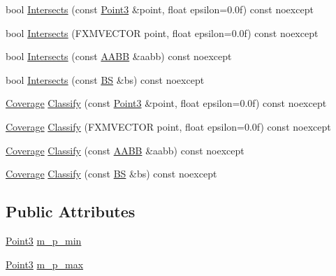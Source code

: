 \begin{DoxyCompactItemize}
\item 
bool \hyperlink{structmage_1_1_a_a_b_b_a467e6e2b3e1508982229ab40a36823c4}{Intersects} (const \hyperlink{structmage_1_1_point3}{Point3} \&point, float epsilon=0.\+0f) const noexcept
\item 
bool \hyperlink{structmage_1_1_a_a_b_b_adba18d1e707f7b926476948216353206}{Intersects} (F\+X\+M\+V\+E\+C\+T\+OR point, float epsilon=0.\+0f) const noexcept
\item 
bool \hyperlink{structmage_1_1_a_a_b_b_a9c776b78b3125957bafc9ee99f7eedee}{Intersects} (const \hyperlink{structmage_1_1_a_a_b_b}{A\+A\+BB} \&aabb) const noexcept
\item 
bool \hyperlink{structmage_1_1_a_a_b_b_ac51fa4b4d3100d587c6a2d2b5513ad88}{Intersects} (const \hyperlink{structmage_1_1_b_s}{BS} \&bs) const noexcept
\item 
\hyperlink{namespacemage_aa9fe157e5a578a103160266df8cccb0a}{Coverage} \hyperlink{structmage_1_1_a_a_b_b_a771c9e7fb467e6ae12bd3ea879a8d9b9}{Classify} (const \hyperlink{structmage_1_1_point3}{Point3} \&point, float epsilon=0.\+0f) const noexcept
\item 
\hyperlink{namespacemage_aa9fe157e5a578a103160266df8cccb0a}{Coverage} \hyperlink{structmage_1_1_a_a_b_b_acb76f0bfa297a297459736892508a8f4}{Classify} (F\+X\+M\+V\+E\+C\+T\+OR point, float epsilon=0.\+0f) const noexcept
\item 
\hyperlink{namespacemage_aa9fe157e5a578a103160266df8cccb0a}{Coverage} \hyperlink{structmage_1_1_a_a_b_b_a835279b552703bd72fa19856ad27cbd7}{Classify} (const \hyperlink{structmage_1_1_a_a_b_b}{A\+A\+BB} \&aabb) const noexcept
\item 
\hyperlink{namespacemage_aa9fe157e5a578a103160266df8cccb0a}{Coverage} \hyperlink{structmage_1_1_a_a_b_b_a3092e0f6765695222f78bcfd78d67a6b}{Classify} (const \hyperlink{structmage_1_1_b_s}{BS} \&bs) const noexcept
\end{DoxyCompactItemize}
\subsection*{Public Attributes}
\begin{DoxyCompactItemize}
\item 
\hyperlink{structmage_1_1_point3}{Point3} \hyperlink{structmage_1_1_a_a_b_b_af5b7608aa0e332d70edfe0cb77bd27c2}{m\+\_\+p\+\_\+min}
\item 
\hyperlink{structmage_1_1_point3}{Point3} \hyperlink{structmage_1_1_a_a_b_b_a51643192d891301df8d8d3f24abd2a27}{m\+\_\+p\+\_\+max}
\end{DoxyCompactItemize}


